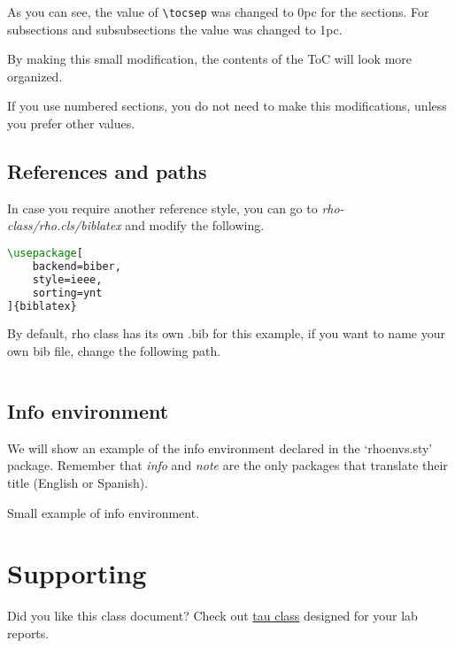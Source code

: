 \documentclass[9pt,a4paper,twoside]{rho-class/rho}
\begin{document}
        As you can see, the value of \verb|\tocsep| was changed to 0pc for the sections. For subsections and subsubsections the value was changed to 1pc.

        By making this small modification, the contents of the ToC will look more organized.

        If you use numbered sections, you do not need to make this modifications, unless you prefer other values.

    \subsection{References and paths}

        In case you require another reference style, you can go to \textit{rho-class/rho.cls/biblatex} and modify the following. 

\nolinenumbers
\begin{lstlisting}[language=TeX, caption=Reference code.]
\usepackage[
    backend=biber,
    style=ieee,
    sorting=ynt
]{biblatex}
\end{lstlisting}
\linenumbers

        By default, rho class has its own .bib for this example, if you want to name your own bib file, change the following path.

\nolinenumbers
\begin{lstlisting}[language=TeX]

\end{lstlisting}
\linenumbers

    \subsection{Info environment}

        We will show an example of the info environment declared in the ‘rhoenvs.sty’ package. Remember that \textit{info} and \textit{note} are the only packages that translate their title (English or Spanish).

        \begin{info}
            Small example of info environment.
        \end{info}

\section{Supporting}

    Did you like this class document? Check out \href{https://www.overleaf.com/latex/templates/tau-class-lab-report-template/chhshmhxstsq}{tau class} designed for your lab reports.
\end{document}

